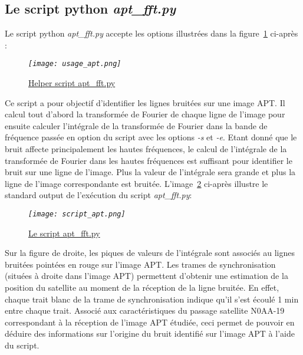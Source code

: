 \documentclass[12pt,fleqn]{book} %
\begin{document}
\subsection{Le script python \emph{apt\_fft.py}}
Le script python \emph{apt\_fft.py} accepte les options illustrées dans la figure~\underline{\color{blue}\ref{usage_apt}} ci-après :
\begin{figure}[H]
	\centering
	\itshape
	\texttt{[image: usage\_apt.png]}
	\caption{\label{usage_apt} \underline{Helper script apt\_fft.py}}
\end{figure}
Ce script a pour objectif d'identifier les lignes bruitées sur une image APT. Il calcul tout d'abord la transformée de Fourier de chaque ligne de l'image pour ensuite calculer l'intégrale de la transformée de Fourier dans la bande de fréquence passée en option du script avec les options \emph{-s} et \emph{-e}.
Etant donné que le bruit affecte principalement les hautes fréquences, le calcul de l'intégrale de la transformée de Fourier dans les hautes fréquences est suffisant pour identifier le bruit sur une ligne de l'image. Plus la valeur de l'intégrale sera grande et plus la ligne de l'image correspondante est bruitée.
L'image~\underline{\color{blue}\ref{script_apt}} ci-après illustre le standard output de l'exécution du script \emph{apt\_fft.py}:
\begin{figure}[H]
	\centering
	\itshape
	\texttt{[image: script\_apt.png]}
	\caption{\label{script_apt} \underline{Le script apt\_fft.py}}
\end{figure}
Sur la figure de droite, les piques de valeurs de l'intégrale sont associés au lignes bruitées pointées en rouge sur l'image APT. Les trames de synchronisation (situées à droite dans l'image APT) permettent d'obtenir une estimation de la position du satellite au moment de la réception de la ligne bruitée.
En effet, chaque trait blanc de la trame de synchronisation indique qu'il s'est écoulé 1 min entre chaque trait. Associé aux caractéristiques du passage satellite N0AA-19 correspondant à la réception de l'image APT étudiée, ceci permet de pouvoir en déduire des informations sur l'origine du bruit identifié sur l'image APT à l'aide du script. 
\end{document}
